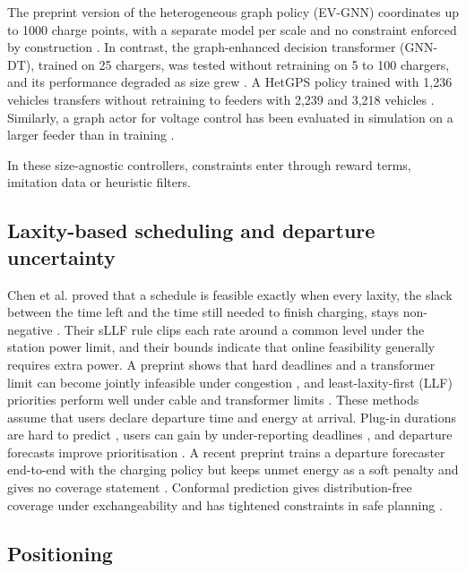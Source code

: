 The preprint version of the heterogeneous graph policy (EV-GNN) coordinates up to 1000 charge points, with a separate model per scale and no constraint enforced by construction \cite{orfanoudakis2025scalable}.
In contrast, the graph-enhanced decision transformer (GNN-DT), trained on 25 chargers, was tested without retraining on 5 to 100 chargers, and its performance degraded as size grew \cite{orfanoudakis2026graph}.
A HetGPS policy trained with 1,236 vehicles transfers without retraining to feeders with 2,239 and 3,218 vehicles \cite{wang2026hetgps}.
Similarly, a graph actor for voltage control has been evaluated in simulation on a larger feeder than in training \cite{jin2026telemetry}.

In these size-agnostic controllers, constraints enter through reward terms, imitation data or heuristic filters.

\subsection{Laxity-based scheduling and departure uncertainty}\label{sec:rw-laxity}

Chen et al. proved that a schedule is feasible exactly when every laxity, the slack between the time left and the time still needed to finish charging, stays non-negative \cite{chen2022smoothed}.
Their sLLF rule clips each rate around a common level under the station power limit, and their bounds indicate that online feasibility generally requires extra power.
A preprint shows that hard deadlines and a transformer limit can become jointly infeasible under congestion \cite{reddy2026deadline}, and least-laxity-first (LLF) priorities perform well under cable and transformer limits \cite{vanhuffelen2025grid,christensen2025multiagent}.
These methods assume that users declare departure time and energy at arrival.
Plug-in durations are hard to predict \cite{dyo2022behavior}, users can gain by under-reporting deadlines \cite{ferragut2022scheduling}, and departure forecasts improve prioritisation \cite{frendo2021improving}.
A recent preprint trains a departure forecaster end-to-end with the charging policy but keeps unmet energy as a soft penalty and gives no coverage statement \cite{gabriele2026forecasting}.
Conformal prediction gives distribution-free coverage under exchangeability \cite{lei2018distributionfree,angelopoulos2023conformal} and has tightened constraints in safe planning \cite{lindemann2023safe}.

\subsection{Positioning}\label{sec:rw-position}

